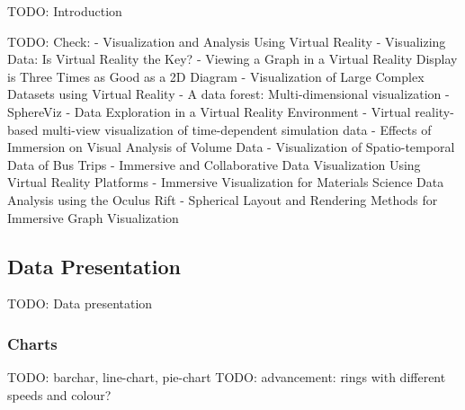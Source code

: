 TODO: Introduction

TODO: Check:
\cite{Ribarsky1994} - Visualization and Analysis Using Virtual Reality
\cite{Stone1994} - Visualizing Data: Is Virtual Reality the Key?
\cite{Ware1994} - Viewing a Graph in a Virtual Reality Display is Three Times as Good as a 2D Diagram
\cite{Sarathy2000} - Visualization of Large Complex Datasets using Virtual Reality
\cite{Jamieson2007} - A data forest: Multi-dimensional visualization
\cite{Soldati2007} - SphereViz - Data Exploration in a Virtual Reality Environment
\cite{Hentschel2009} - Virtual reality-based multi-view visualization of time-dependent simulation data
\cite{Laha2012} - Effects of Immersion on Visual Analysis of Volume Data
\cite{Nguyen2012} - Visualization of Spatio-temporal Data of Bus Trips
\cite{Donalek2014} - Immersive and Collaborative Data Visualization Using Virtual Reality Platforms
\cite{Drouhard2015} - Immersive Visualization for Materials Science Data Analysis using the Oculus Rift
\cite{Kwon2015} - Spherical Layout and Rendering Methods for Immersive Graph Visualization





\subsection{Data Presentation}


TODO: Data presentation


\subsubsection{Charts}

TODO: barchar, line-chart, pie-chart
TODO: advancement: rings with different speeds and colour?
\cite{CodeScience2015}


